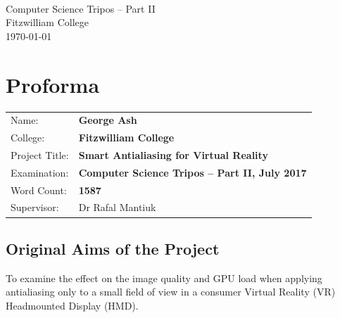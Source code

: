 \documentclass[12pt,a4paper,twoside,openright]{report}
\begin{document}





\pagestyle{empty}


\vspace*{60mm}
\begin{center}
\Huge
\textbf{} \\[5mm]
Computer Science Tripos -- Part II \\[5mm]
Fitzwilliam College \\[5mm]
\today  %
\end{center}


\pagestyle{plain}

\chapter*{Proforma}

{\large
\begin{tabular}{ll}
Name:               & \bf George Ash                       \\
College:            & \bf Fitzwilliam College                     \\
Project Title:      & \bf Smart Antialiasing for Virtual Reality \\
Examination:        & \bf Computer Science Tripos -- Part II, July 2017  \\
Word Count:         & \bf 1587\footnotemark[1] \\
Supervisor:         & Dr Rafal Mantiuk                    \\ 
\end{tabular}
}


\section*{Original Aims of the Project}

To examine the effect on the image quality and GPU load when applying antialiasing only to a small field of view in a consumer Virtual Reality (VR) Headmounted Display (HMD).
\end{document}
